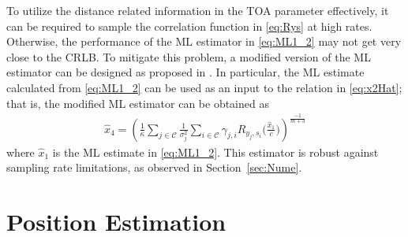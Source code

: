 \documentclass[10pt,twocolumn]{IEEEtran}
\newcommand{\mtC}{{\mathcal{C}}}
\begin{document}
To utilize the distance related information in the TOA parameter effectively, it can be required to sample the correlation function in \eqref{eq:Rys} at high rates. Otherwise, the performance of the ML estimator in \eqref{eq:ML1_2} may not get very close to the CRLB. To mitigate this problem, a modified version of the ML estimator can be designed as proposed in \cite{MFK_CRLB}. In particular, the ML estimate calculated from \eqref{eq:ML1_2} can be used as an input to the relation in \eqref{eq:x2Hat}; that is, the modified ML estimator can be obtained as
\begin{gather}\label{eq:x4Hat}
\widehat{x}_4=\left(\frac{1}{\kappa}\sum_{j\in\mtC}\frac{1}{\sigma_j^2}
\sum_{i\in\mtC}
\gamma_{j,i}R_{y_j,s_i}\bigg(\frac{\widehat{x}_1}{c}\bigg)\right)^{\frac{-1}{m+3}}
\end{gather}
where $\widehat{x}_1$ is the ML estimate in \eqref{eq:ML1_2}. This estimator is robust against sampling rate limitations, as observed in Section~\ref{sec:Nume}.


\section{Position Estimation}\label{sec:PosEst}
\end{document}

